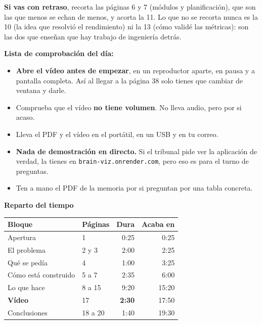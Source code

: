 \documentclass[12pt, a4paper]{article}
\begin{document}
\textbf{Si vas con retraso}, recorta las páginas 6 y 7 (módulos y planificación), que son las que
menos se echan de menos, y acorta la 11. Lo que no se recorta nunca es la 10 (la idea que resolvió el
rendimiento) ni la 13 (cómo validé las métricas): son las dos que enseñan que hay trabajo de
ingeniería detrás.

\vspace{0.5em}
\textbf{Lista de comprobación del día:}
\begin{itemize}[leftmargin=1.4em, itemsep=0.2em]
	\item \textbf{Abre el vídeo antes de empezar}, en un reproductor aparte, en pausa y a pantalla
		completa. Así al llegar a la página 38 solo tienes que cambiar de ventana y darle.
	\item Comprueba que el vídeo \textbf{no tiene volumen}. No lleva audio, pero por si acaso.
	\item Lleva el PDF y el vídeo en el portátil, en un USB y en tu correo.
	\item \textbf{Nada de demostración en directo.} Si el tribunal pide ver la aplicación de verdad,
		la tienes en \texttt{brain-viz.onrender.com}, pero eso es para el turno de preguntas.
	\item Ten a mano el PDF de la memoria por si preguntan por una tabla concreta.
\end{itemize}

\vspace{0.6em}
\textbf{Reparto del tiempo}
\vspace{0.3em}

\begin{center}\footnotesize
\begin{tabularx}{\textwidth}{@{}l X r r@{}}
	\toprule
	\textbf{Bloque} & \textbf{Páginas} & \textbf{Dura} & \textbf{Acaba en} \\
	\midrule
	Apertura              & 1       & 0:25 & 0:25 \\
	El problema           & 2 y 3   & 2:00 & 2:25 \\
	Qué se pedía          & 4       & 1:00 & 3:25 \\
	Cómo está construido  & 5 a 7   & 2:35 & 6:00 \\
	Lo que hace           & 8 a 15  & 9:20 & 15:20 \\
	\textbf{Vídeo}        & 17      & \textbf{2:30} & 17:50 \\
	Conclusiones          & 18 a 20 & 1:40 & 19:30 \\
	\bottomrule
\end{tabularx}
\end{center}
\end{document}
